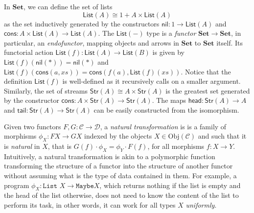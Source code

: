 \documentclass[a4paper,UKenglish,cleveref, autoref, thm-restate]{lipics-v2021}
\newcommand{\operator}[1]{\textsf{#1}}
\newcommand{\head}{\operator{head}}
\newcommand{\tail}{\operator{tail}}
\newcommand{\CatC}{\mathcal{C}}
\newcommand{\CatD}{\mathcal{D}}
\newcommand{\Set}{\mathbf{Set}}
\newcommand{\iso}{\cong}
\newcommand{\Obj}{\text{Obj}}
\newcommand{\Str}[1]{\operator{Str}(#1)}
\newcommand{\List}[1]{\operator{List}(#1)}
\newcommand{\nil}{\operator{nil}}
\newcommand{\cons}{\operator{cons}}
\begin{document}
In $\Set$, we can define the set of lists
\[
  \List{A} \iso 1 + A \times \List{A}
\]
as the set inductively generated by the constructors $\nil : 1 \to \List{A}$ and
$\cons : A \times \List{A} \to \List{A}$. The $\List{-}$ type is a
\emph{functor} $\Set \to \Set$, in particular, an \emph{endofunctor}, mapping
objects and arrows in $\Set$ to $\Set$ itself.
Its functorial action $\List{f} : \List{A} \to \List{B}$ is given by
$\List{f}(\nil(*)) = \nil(*)$ and
$\List{f}(\cons(a,xs)) = \cons(f(a), \List{f}(xs))$. Notice that the definition
$\List{f}$ is well-defined as it recursively calls on a smaller argument.
Similarly, the set of streams $\Str{A} \iso A \times \Str{A}$ is the greatest
set generated by the constructor $\cons : A \times \Str{A} \to \Str{A}$. The
maps $\head : \Str{A} \to A$ and $\tail : \Str{A} \to \Str{A}$ can be easily
constructed from the isomorphism.

Given two functors $F, G : \CatC \to \CatD$, a \emph{natural transformation} is
is a family of morphisms $\phi_{X} : FX \to GX$ indexed
by the objects $X \in \Obj(\CatC)$ and such that it is \emph{natural} in $X$,
that is $ G(f) \cdot \phi_{X} = \phi_{Y} \cdot F(f)$, for all morphisms
$f : X \to Y$. Intuitively, a natural transformation is akin to a polymorphic
function transforming the structure of a functor into the structure of another
functor without assuming what is the type of data contained in them.  For
example, a program $\phi_{X} : \texttt{List }X \to \texttt{Maybe} X$, which returns
nothing if the list is empty and the head of the list otherwise, does not need to know the content of the list to perform its task, in other words, it can work for all
types $X$ \emph{uniformly}.
\end{document}
